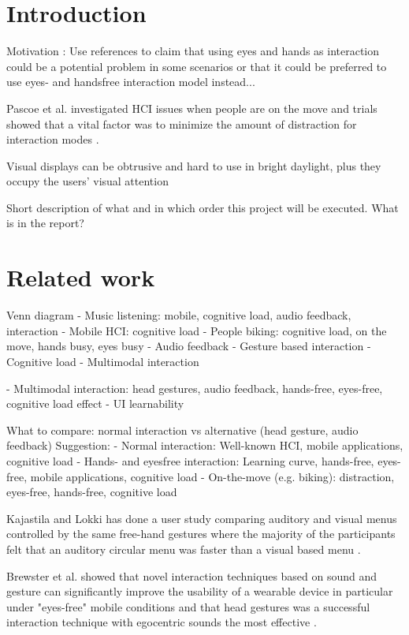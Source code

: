 \documentclass{article}
\begin{document}
\clearpage

\tableofcontents

\clearpage

\section{Introduction}
Motivation : Use references to claim that using eyes and hands as interaction could be a potential problem in some scenarios or that it could be preferred to use eyes- and handsfree interaction model instead...

Pascoe et al. investigated HCI issues when people are on the move and trials showed that a vital factor was to minimize the amount of distraction for interaction modes \cite{pascoe_using_2000}.

Visual displays can be obtrusive and hard to use in bright daylight, plus they occupy the users’ visual attention \cite{geelhoed_safety_2000}

Short description of what and in which order this project will be executed. What is in the report?


\section{Related work}
Venn diagram
- Music listening: mobile, cognitive load, audio feedback, interaction
- Mobile HCI: cognitive load
- People biking: cognitive load, on the move, hands busy, eyes busy
- Audio feedback
- Gesture based interaction
- Cognitive load
- Multimodal interaction

- Multimodal interaction: head gestures, audio feedback, hands-free, eyes-free, cognitive load effect
- UI learnability

What to compare:
normal interaction vs alternative (head gesture, audio feedback)
Suggestion:
- Normal interaction: Well-known HCI, mobile applications, cognitive load
- Hands- and eyesfree interaction: Learning curve, hands-free, eyes-free, mobile applications, cognitive load
- On-the-move (e.g. biking): distraction, eyes-free, hands-free, cognitive load

Kajastila and Lokki has done a user study comparing auditory and visual menus controlled by the same free-hand gestures where the majority of the participants felt that an auditory circular menu was faster than a visual based menu \cite{kajastila_interaction_2013}.

Brewster et al. showed that novel interaction techniques based on sound and gesture can significantly improve the usability of a wearable device in particular under "eyes-free" mobile conditions and that head gestures was a successful interaction technique with egocentric sounds the most effective \cite{brewster_multimodaleyes-freeinteraction_2003}.
\end{document}
